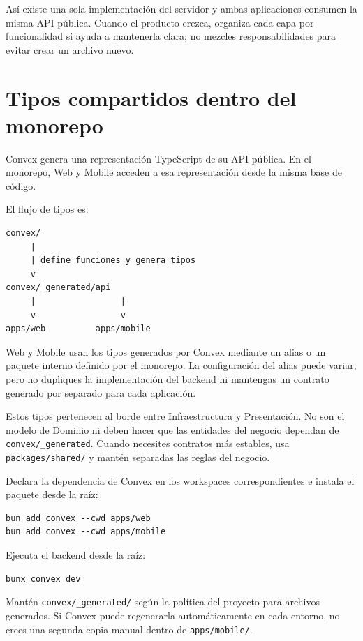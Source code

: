 \documentclass[11pt,a4paper]{article}
\begin{document}
Así existe una sola implementación del servidor y ambas aplicaciones consumen
la misma API pública. Cuando el producto crezca, organiza cada capa por
funcionalidad si ayuda a mantenerla clara; no mezcles responsabilidades para
evitar crear un archivo nuevo.

\section{Tipos compartidos dentro del monorepo}

Convex genera una representación TypeScript de su API pública. En el monorepo,
Web y Mobile acceden a esa representación desde la misma base de código.

El flujo de tipos es:

\begin{lstlisting}
convex/
     |
     | define funciones y genera tipos
     v
convex/_generated/api
     |                 |
     v                 v
apps/web          apps/mobile
\end{lstlisting}

Web y Mobile usan los tipos generados por Convex mediante un alias o un paquete
interno definido por el monorepo. La configuración del alias puede variar, pero
no dupliques la implementación del backend ni mantengas un contrato generado
por separado para cada aplicación.

Estos tipos pertenecen al borde entre Infraestructura y Presentación. No son el
modelo de Dominio ni deben hacer que las entidades del negocio dependan de
\texttt{convex/\_generated}. Cuando necesites contratos más estables, usa
\texttt{packages/shared/} y mantén separadas las reglas del negocio.

Declara la dependencia de Convex en los workspaces correspondientes e instala
el paquete desde la raíz:

\begin{lstlisting}
bun add convex --cwd apps/web
bun add convex --cwd apps/mobile
\end{lstlisting}

Ejecuta el backend desde la raíz:

\begin{lstlisting}
bunx convex dev
\end{lstlisting}

Mantén \texttt{convex/\_generated/} según la política del proyecto para archivos
generados. Si Convex puede regenerarla automáticamente en cada entorno, no
crees una segunda copia manual dentro de \texttt{apps/mobile/}.
\end{document}
